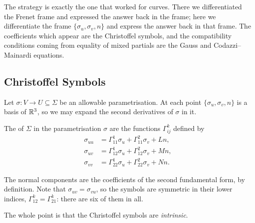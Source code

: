\documentclass[a4paper]{scrartcl}
\begin{document}
The strategy is exactly the one that worked for curves. There we differentiated the Frenet frame and expressed the answer back in the frame; here we differentiate the frame $\{\sigma_u, \sigma_v, n\}$ and express the answer back in that frame. The coefficients which appear are the Christoffel symbols, and the compatibility conditions coming from equality of mixed partials are the Gauss and Codazzi--Mainardi equations.

\subsection{Christoffel Symbols}

Let $\sigma: V \rightarrow U \subseteq \Sigma$ be an allowable parametrisation. At each point $\{\sigma_u, \sigma_v, n\}$ is a basis of $\mathbb{R}^3$, so we may expand the second derivatives of $\sigma$ in it.

\begin{definition}
    The  of $\Sigma$ in the parametrisation $\sigma$ are the functions $\Gamma^k_{ij}$ defined by
    \begin{align*}
        \sigma_{uu} &= \Gamma^1_{11}\sigma_u + \Gamma^2_{11}\sigma_v + L n, \\
        \sigma_{uv} &= \Gamma^1_{12}\sigma_u + \Gamma^2_{12}\sigma_v + M n, \\
        \sigma_{vv} &= \Gamma^1_{22}\sigma_u + \Gamma^2_{22}\sigma_v + N n.
    \end{align*}
\end{definition}

The normal components are the coefficients of the second fundamental form, by definition. Note that $\sigma_{uv} = \sigma_{vu}$, so the symbols are symmetric in their lower indices, $\Gamma^k_{12} = \Gamma^k_{21}$: there are six of them in all.

The whole point is that the Christoffel symbols are \emph{intrinsic}.
\end{document}
